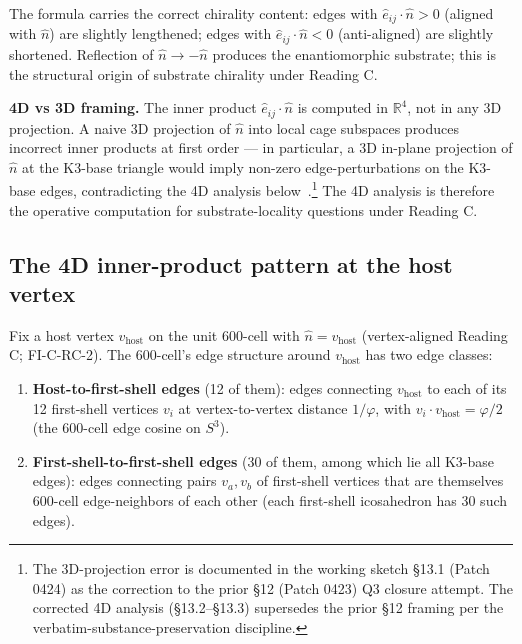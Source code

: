 \documentclass[11pt,letterpaper]{article}
\newcommand{\phig}{\varphi}
\begin{document}
The formula carries the correct chirality content: edges with $\hat{e}_{ij} \cdot \hat{n} > 0$ (aligned with $\hat{n}$) are slightly lengthened; edges with $\hat{e}_{ij} \cdot \hat{n} < 0$ (anti-aligned) are slightly shortened. Reflection of $\hat{n} \to -\hat{n}$ produces the enantiomorphic substrate; this is the structural origin of substrate chirality under Reading C.

\textbf{4D vs 3D framing.} The inner product $\hat{e}_{ij} \cdot \hat{n}$ is computed in $\mathbb{R}^4$, not in any 3D projection. A naive 3D projection of $\hat{n}$ into local cage subspaces produces incorrect inner products at first order --- in particular, a 3D in-plane projection of $\hat{n}$ at the K3-base triangle would imply non-zero edge-perturbations on the K3-base edges, contradicting the 4D analysis below~\cite{abshier_capotauro_chiral_mechanism_sketch}.\footnote{The 3D-projection error is documented in the working sketch \S13.1 (Patch 0424) as the correction to the prior \S12 (Patch 0423) Q3 closure attempt. The corrected 4D analysis (\S13.2--\S13.3) supersedes the prior \S12 framing per the verbatim-substance-preservation discipline.} The 4D analysis is therefore the operative computation for substrate-locality questions under Reading C.

\subsection{The 4D inner-product pattern at the host vertex}\label{sec:host_vertex_inner_products}

Fix a host vertex $v_{\text{host}}$ on the unit 600-cell with $\hat{n} = v_{\text{host}}$ (vertex-aligned Reading C; FI-C-RC-2). The 600-cell's edge structure around $v_{\text{host}}$ has two edge classes:

\begin{enumerate}\setlength\itemsep{0.2em}
    \item \textbf{Host-to-first-shell edges} (12 of them): edges connecting $v_{\text{host}}$ to each of its 12 first-shell vertices $v_i$ at vertex-to-vertex distance $1/\phig$, with $v_i \cdot v_{\text{host}} = \phig/2$ (the 600-cell edge cosine on $S^3$).
    \item \textbf{First-shell-to-first-shell edges} (30 of them, among which lie all K3-base edges): edges connecting pairs $v_a, v_b$ of first-shell vertices that are themselves 600-cell edge-neighbors of each other (each first-shell icosahedron has 30 such edges).
\end{enumerate}
\end{document}
